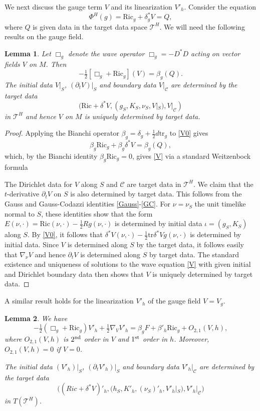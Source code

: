\documentclass[10pt]{amsart}
\renewcommand{\b}{\beta}
\renewcommand{\d}{\delta}
\newcommand{\cC}{{\mathcal C}}
\newcommand{\cT}{{\mathcal T}}
\newcommand{\Ric}{\mathrm{Ric}}
\newcommand{\be}{\begin{equation}}
\newcommand{\ee}{\end{equation}}
\newcommand{\tr}{\mathrm{tr}}
\newcommand{\p}{\partial}
\newcommand{\<}{\langle}
\renewcommand{\>}{\rangle}
\theoremstyle{plain}
\newtheorem{lemma}{Lemma}[section]
\theoremstyle{remark}
\theoremstyle{definition}
\numberwithin{equation}{section}
\begin{document}
   We next discuss the gauge term $V$ and its linearization $V'_h$. Consider the equation  
\be \label{V0}
\Phi^H(g) = \Ric_g + \d_g^*V = Q, 
\ee
where $Q$ is given data in the target data space $\cT^H$. We will need the following results on the gauge field. 
 
\begin{lemma}\label{Gauge-lemma}
Let $\Box_g$ denote the wave operator $\Box_g = - D^*D$ acting on vector fields $V$ on $M$. Then  
\be \label{V}
-\tfrac{1}{2}[\Box_g + \Ric_g](V) = \b_g(Q).
\ee
The initial data $V|_S$, $(\p_t V)|_S$ and boundary data $V|_{\cC}$ are determined by the target data  
$$(\Ric + \d^*V, (g_S, K_S, \nu_S, V|_S), V|_{\cC})$$
in $\cT^H$ and hence $V$ on $M$ is uniquely determined by target data. 

\end{lemma}

\begin{proof}
Applying the Bianchi operator $\b_g = \d_g + \frac{1}{2}d \tr_g$ to \eqref{V0} gives 
\be \label{V2}
\b_g \Ric_g + \b_g \d^*V = \b_g(Q),
\ee
which, by the Bianchi identity $\b_g \Ric_g = 0$, gives \eqref{V} via a standard Weitzenbock formula 

The Dirichlet data for $V$ along $S$ and $\cC$ are target data in $\cT^H$. We claim that the $t$-derivative $\p_t V$ on $S$ is also 
determined by target data. This follows from the Gauss and Gauss-Codazzi identities \eqref{Gauss}-\eqref{GC}. For $\nu = \nu_S$ the 
unit timelike normal to $S$, these identities show that the form $E(\nu, \cdot) = \Ric(\nu, \cdot) - \frac{1}{2}R g(\nu, \cdot)$ is determined by 
initial data $\iota = (g_S, K_S)$ along $S$. By \eqref{V0}, it follows that $\d^*V(\nu, \cdot) - \frac{1}{2}\tr \d^*V g(\nu, \cdot)$ is determined by 
initial data. Since $V$ is determined along $S$ by the target data, it follows easily that $\nabla_{\nu}V$ and hence $\p_t V$ is determined 
along $S$ by target data. The standard existence and uniqueness of solutions to the wave equation \eqref{V} with given initial 
and Dirichlet boundary data then shows that $V$ is uniquely determined by target data. 

\end{proof}

 A similar result holds for the linearization $V'_h$ of the gauge field $V = V_g$. 
\begin{lemma}\label{Gauge-lemma2}
We have 
\be \label{V'eqn}
-\tfrac{1}{2}(\Box_g + \Ric_g)V'_h + \tfrac{1}{2}\nabla_V V'_h = \b_g F + \b'_h \Ric_g + O_{2,1}(V,h),
\ee
where $O_{2,1}(V,h)$ is $2^{\rm nd}$ order in $V$ and $1^{\rm st}$ order in $h$. Moreover, $O_{2,1}(V,h) = 0$ if $V = 0$. 

  The initial data $(V'_h)|_S$, $(\p_t V'_h)|_S$ and boundary data $V'_h|_{\cC}$ are determined by the target data  
$$\big((Ric + \d^*V)'_h, (h_S, K'_h, (\nu_S)'_h, V'_h |_S), V'_h |_{\cC} \big)$$
in $T(\cT^H)$.
\end{lemma}
\end{document}
